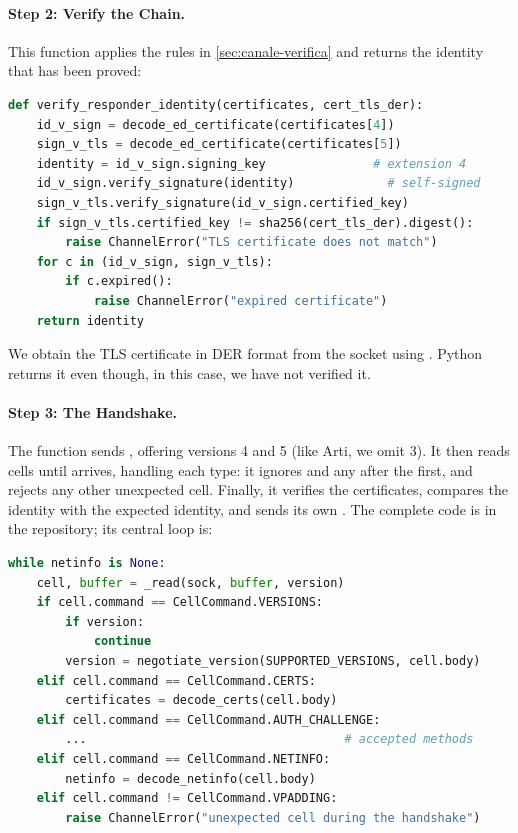 \paragraph{Step 2: Verify the Chain.} This function applies the rules in \cref{sec:canale-verifica} and returns the identity that has been proved:

\begin{lstlisting}[language=Python]
def verify_responder_identity(certificates, cert_tls_der):
    id_v_sign = decode_ed_certificate(certificates[4])
    sign_v_tls = decode_ed_certificate(certificates[5])
    identity = id_v_sign.signing_key               # extension 4
    id_v_sign.verify_signature(identity)             # self-signed
    sign_v_tls.verify_signature(id_v_sign.certified_key)
    if sign_v_tls.certified_key != sha256(cert_tls_der).digest():
        raise ChannelError("TLS certificate does not match")
    for c in (id_v_sign, sign_v_tls):
        if c.expired():
            raise ChannelError("expired certificate")
    return identity
\end{lstlisting}

We obtain the TLS certificate in DER format from the socket using . Python returns it even though, in this case, we have not verified it.

\paragraph{Step 3: The Handshake.} The  function sends , offering versions 4 and 5 (like Arti, we omit 3). It then reads cells until  arrives, handling each type: it ignores  and any  after the first, and rejects any other unexpected cell. Finally, it verifies the certificates, compares the identity with the expected identity, and sends its own . The complete code is in the repository; its central loop is:

\begin{lstlisting}[language=Python]
while netinfo is None:
    cell, buffer = _read(sock, buffer, version)
    if cell.command == CellCommand.VERSIONS:
        if version:
            continue
        version = negotiate_version(SUPPORTED_VERSIONS, cell.body)
    elif cell.command == CellCommand.CERTS:
        certificates = decode_certs(cell.body)
    elif cell.command == CellCommand.AUTH_CHALLENGE:
        ...                                    # accepted methods
    elif cell.command == CellCommand.NETINFO:
        netinfo = decode_netinfo(cell.body)
    elif cell.command != CellCommand.VPADDING:
        raise ChannelError("unexpected cell during the handshake")
\end{lstlisting}

